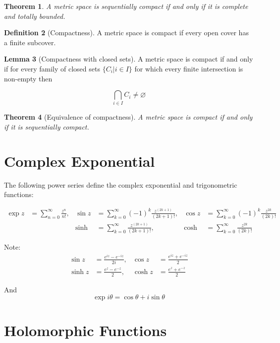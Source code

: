 \documentclass[11pt,a4paper, titlepage]{article}
\newtheorem{theorem}{Theorem}[section]
\theoremstyle{definition}
\newtheorem{definition}[theorem]{Definition}
\newtheorem{lemma}[theorem]{Lemma}
\begin{document}
\begin{theorem}
A metric space is sequentially compact if and only if it is complete and totally bounded.
\end{theorem}

\begin{definition}[Compactness]
A metric space is compact if every open cover has a finite subcover.
\end{definition}

\begin{lemma}[Compactness with closed sets]

A metric space is compact if and only if for every family of closed sets $\{C_i | i \in I\}$ for which every finite intersection is non-empty then 

\[
	\bigcap_{i \in I} C_i \neq \varnothing
\]
\end{lemma}

\begin{theorem}[Equivalence of compactness]
A metric space is compact if and only if it is sequentially compact.
\end{theorem}

\section{Complex Exponential}

The following power series define the complex exponential and trigonometric functions:

\begin{align*}
	\exp z &= \sum_{n = 0}^\infty \frac{z^n}{n!}, & \sin z &= \sum_{k = 0}^\infty (-1)^k\frac{z^{(2k+1)}}{(2k + 1)!},& \cos z &= \sum_{k = 0}^\infty (-1)^k\frac{z^{2k}}{(2k)!} \\
 	&& \sinh &= \sum_{k = 0}^\infty \frac{z^{(2k+1)}}{(2k + 1)!}, &\cosh &= \sum_{k = 0}^\infty \frac{z^{2k}}{(2k)!}
\end{align*}

Note:
\begin{align*}
\sin z &= \frac{e^{iz} - e^{-iz}}{2i}, & \cos z &= \frac{e^{iz} + e^{-iz}}{2} \\
\sinh z &= \frac{e^{z} - e^{-z}}{2}, & \cosh z &= \frac{e^{z} + e^{-z}}{2}
\end{align*}

And
\[
	\exp i \theta = \cos \theta + i \sin \theta
\]
	


\section{Holomorphic Functions}
\end{document}
